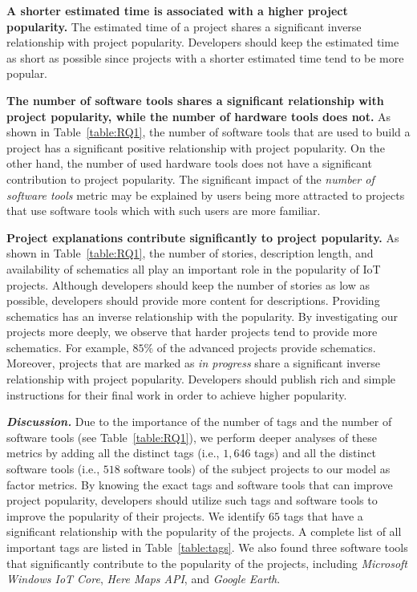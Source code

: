 \textbf{A shorter estimated time is associated with a higher project popularity.} The estimated time of a project shares a significant inverse relationship with project popularity. Developers should keep the estimated time as short as possible since projects with a shorter estimated time tend to be more popular.


\textbf{The number of software tools shares a significant relationship with project popularity, while the number of hardware tools does not.} As shown in Table~\ref{table:RQ1}, the number of software tools that are used to build a project has a significant positive relationship with project popularity. On the other hand, the number of used hardware tools does not have a significant contribution to project popularity. The significant impact of the {\em number of software tools} metric may be explained by users being more attracted to projects that use software tools which with such users are more familiar.

\textbf{Project explanations contribute significantly to project popularity.}
As shown in Table~\ref{table:RQ1}, the number of stories, description length, and availability of schematics all play an important role in the popularity of IoT projects.
Although developers should keep the number of stories as low as possible, developers should provide more content for descriptions.
Providing schematics has an inverse relationship with the popularity. By investigating our projects more deeply, we observe that harder projects tend to provide more schematics.
For example, $85\%$ of the advanced projects provide schematics.
Moreover, projects that are marked as \textit{in progress} share a significant inverse relationship with project popularity.
Developers should publish rich and simple instructions for their final work in order to achieve higher popularity.




\noindent\textbf{\textit{Discussion.}}
Due to the importance of the number of tags and the number of software tools (see Table~\ref{table:RQ1}), we perform deeper analyses of these metrics by adding all the distinct tags (i.e., $1,646$ tags) and all the distinct software tools (i.e., $518$ software tools) of the subject projects to our model as factor metrics.
By knowing the exact tags and software tools that can improve project popularity, developers should utilize such tags and software tools to improve the popularity of their projects.
We identify $65$ tags that have a significant relationship with the popularity of the projects. A complete list of all important tags are listed in Table~\ref{table:tags}. We also found three software tools that significantly contribute to the popularity of the projects, including \emph{Microsoft Windows IoT Core}, \emph{Here Maps API}, and \emph{Google Earth}.



